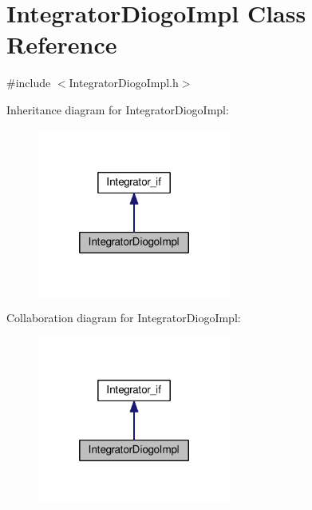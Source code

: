 \hypertarget{class_integrator_diogo_impl}{\section{Integrator\-Diogo\-Impl Class Reference}
\label{class_integrator_diogo_impl}
}


{\ttfamily \#include $<$Integrator\-Diogo\-Impl.\-h$>$}



Inheritance diagram for Integrator\-Diogo\-Impl\-:\nopagebreak
\begin{figure}[H]
\begin{center}
\leavevmode
\includegraphics[width=180pt]{class_integrator_diogo_impl__inherit__graph}
\end{center}
\end{figure}


Collaboration diagram for Integrator\-Diogo\-Impl\-:\nopagebreak
\begin{figure}[H]
\begin{center}
\leavevmode
\includegraphics[width=180pt]{class_integrator_diogo_impl__coll__graph}
\end{center}
\end{figure}
